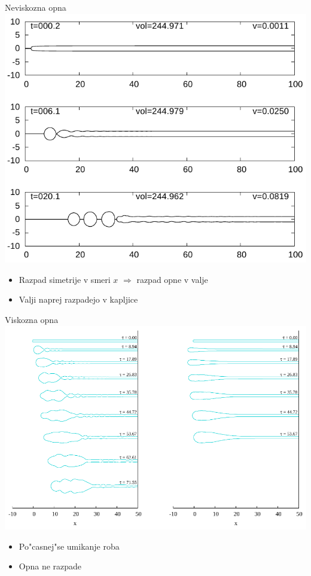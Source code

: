 \documentclass{beamer}
\begin{document}
\begin{frame}{Neviskozna opna}
 \includegraphics[height=.5\textheight]{./Slike/mehurcek-rezultat-1}
 \begin{itemize}
  \item Razpad simetrije v smeri $x$ $\Rightarrow$ razpad opne v valje
  \item Valji naprej razpadejo v kapljice
 \end{itemize}

\end{frame}

\begin{frame}{Viskozna opna}
 \includegraphics[width=.7\textwidth]{./Slike/scat-rezultat-1}
 \begin{itemize}
  \item Po"casnej"se umikanje roba
  \item Opna ne razpade
 \end{itemize}
\end{frame}
 
\end{document}
